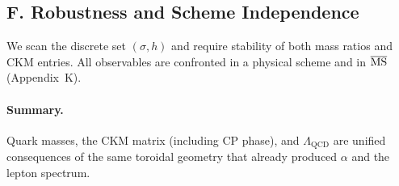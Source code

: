 \subsection*{F. Robustness and Scheme Independence}
We scan the discrete set $(\sigma,h)$ and require stability of both mass ratios and CKM entries.
All observables are confronted in a physical scheme and in $\overline{\rm MS}$ (Appendix~K).

\paragraph{Summary.}
Quark masses, the CKM matrix (including CP phase), and $\Lambda_{\mathrm{QCD}}$ are unified consequences
of the same toroidal geometry that already produced $\alpha$ and the lepton spectrum.

